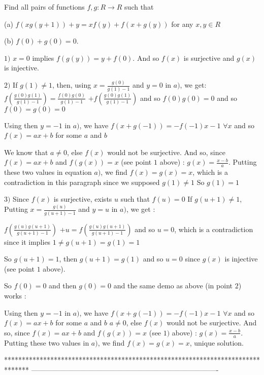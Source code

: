 \begin{mysolution}
	\begin{tcolorbox}Find all pairs of functions $ f,g: R\rightarrow R$ such that

(a) $ f(xg(y + 1)) + y = xf(y) + f(x + g(y))$ for any $ x,y\in R$

(b) $ f(0) + g(0) = 0$.\end{tcolorbox}

$ 1)$ $ x=0$  implies $ f(g(y))=y+f(0)$. And so $ f(x)$ is surjective and $ g(x)$ is injective.

$ 2)$ If $ g(1)\neq 1$, then, using $ x=\frac{g(0)}{g(1)-1}$ and $ y=0$ in $ a)$, we get: 
$ f\left(\frac{g(0)g(1)}{g(1)-1}\right)=\frac{f(0)g(0)}{g(1)-1}$ $ +f\left(\frac{g(0)g(1)}{g(1)-1}\right)$ and so $ f(0)g(0)=0$ and so $ f(0)=g(0)=0$

Using then $ y=-1$ in $ a)$, we have $ f(x+g(-1))=-f(-1)x-1$ $ \forall x$ and so $ f(x)=ax+b$ for some $ a$ and $ b$

We know that $ a\neq 0$, else $ f(x)$ would not be surjective. And so, since $ f(x)=ax+b$ and $ f(g(x))=x$ (see point $ 1$ above) : $ g(x)=\frac{x-b}{a}$.
Putting these two values in equation $ a)$, we find $ f(x)=g(x)=x$, which is a contradiction in this paragraph since we supposed $ g(1)\neq 1$
So $ \boxed{g(1)=1}$

$ 3)$ Since $ f(x)$ is surjective, exists $ u$ such that $ f(u)=0$
If $ g(u+1)\neq 1$, Putting $ x=\frac{g(u)}{g(u+1)-1}$ and $ y=u$ in $ a)$, we get : 

$ f\left(\frac{g(u)g(u+1)}{g(u+1)-1}\right)$ $ +u=f\left(\frac{g(u)g(u+1)}{g(u+1)-1}\right)$ and so $ u=0$, which is a contradiction since it implies $ 1\neq g(u+1)=g(1)=1$

So $ g(u+1)=1$, then $ g(u+1)=g(1)$ and so $ u=0$ since $ g(x)$ is injective (see point $ 1$ above).

So $ f(0)=0$ and then $ g(0)=0$ and the same demo as above (in point $ 2$) works :

Using then $ y=-1$ in $ a)$, we have $ f(x+g(-1))=-f(-1)x-1$ $ \forall x$ and so $ f(x)=ax+b$ for some $ a$ and $ b$
$ a\neq 0$, else $ f(x)$ would not be surjective. And so, since $ f(x)=ax+b$ and $ f(g(x))=x$ (see $ 1)$ above) : $ g(x)=\frac{x-b}{a}$.
Putting these two values in $ a)$, we find $ \boxed{f(x)=g(x)=x}$, unique solution.
\end{mysolution}
*******************************************************************************
-------------------------------------------------------------------------------

